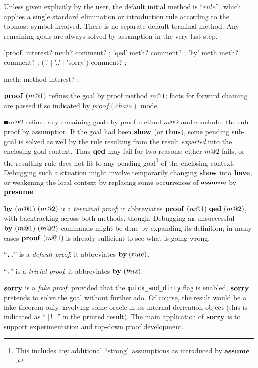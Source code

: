 Unless given explicitly by the user, the default initial method is ``$rule$'',
which applies a single standard elimination or introduction rule according to
the topmost symbol involved.  There is no separate default terminal method.
Any remaining goals are always solved by assumption in the very last step.

\begin{rail}
  'proof' interest? meth? comment?
  ;
  'qed' meth? comment?
  ;
  'by' meth meth? comment?
  ;
  ('.' | '..' | 'sorry') comment?
  ;

  meth: method interest?
  ;
\end{rail}

\begin{descr}
\item [$\PROOF{m@1}$] refines the goal by proof method $m@1$; facts for
  forward chaining are passed if so indicated by $proof(chain)$ mode.
\item [$\QED{m@2}$] refines any remaining goals by proof method $m@2$ and
  concludes the sub-proof by assumption.  If the goal had been ${\mathord{\mathbf{show}}}$ (or
  ${\mathord{\mathbf{thus}}}$), some pending sub-goal is solved as well by the rule resulting
  from the result \emph{exported} into the enclosing goal context.  Thus
  ${\mathord{\mathbf{qed}}}$ may fail for two reasons: either $m@2$ fails, or the resulting
  rule does not fit to any pending goal\footnote{This includes any additional
    ``strong'' assumptions as introduced by ${\mathord{\mathbf{assume}}}$.} of the enclosing
  context.  Debugging such a situation might involve temporarily changing
  ${\mathord{\mathbf{show}}}$ into ${\mathord{\mathbf{have}}}$, or weakening the local context by replacing
  some occurrences of ${\mathord{\mathbf{assume}}}$ by ${\mathord{\mathbf{presume}}}$.
\item [$\BYY{m@1}{m@2}$] is a \emph{terminal proof}; it
  abbreviates $\PROOF{m@1}~\QED{m@2}$, with backtracking across both methods,
  though.  Debugging an unsuccessful $\BYY{m@1}{m@2}$ commands might be done
  by expanding its definition; in many cases $\PROOF{m@1}$ is already
  sufficient to see what is going wrong.
\item [``$\textbf{.\,.}$''] is a \emph{default proof}; it
  abbreviates $\BY{rule}$.
\item [``$\textbf{.}$''] is a \emph{trivial proof}; it
  abbreviates $\BY{this}$.
\item [${\mathord{\mathbf{sorry}}}$] is a \emph{fake proof}; provided that the
  \texttt{quick_and_dirty} flag is enabled, ${\mathord{\mathbf{sorry}}}$ pretends to solve the
  goal without further ado.  Of course, the result would be a fake theorem
  only, involving some oracle in its internal derivation object (this is
  indicated as ``$[!]$'' in the printed result).  The main application of
  ${\mathord{\mathbf{sorry}}}$ is to support experimentation and top-down proof development.
\end{descr}


